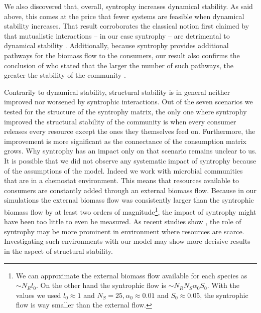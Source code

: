 \documentclass[12pt, titlepage]{report}
\begin{document}
We also discovered that, overall, syntrophy increases dynamical stability. As said above, this comes at the price that fewer systems are feasible when dynamical stability increases. That result corroborates the classical notion first claimed by \citeauthor{may_qualitative_1973} that mutualistic interactions -- in our case syntrophy -- are detrimental to dynamical stability \cite{may_qualitative_1973}. Additionally, because syntrophy provides additional pathways for the biomass flow to the consumers, our result also confirms the conclusion of \citeauthor{macarthur_fluctuations_1955} who stated that the larger the number of such pathways, the greater the stability of the community \cite{macarthur_fluctuations_1955}.

Contrarily to dynamical stability, structural stability is in general neither improved nor worsened by syntrophic interactions. Out of the seven scenarios we tested for the structure of the syntrophy matrix, the only one where syntrophy improved the structural stability of the community is when every consumer releases every resource except the ones they themselves feed on. Furthermore, the improvement is more significant as the connectance of the consumption matrix grows. Why syntrophy has an impact only on that scenario remains unclear to us. It is possible that we did not observe any systematic impact of syntrophy because of the assumptions of the model. Indeed we work with microbial communities that are in a chemostat environment. This means that resources available to consumers are constantly added through an external biomass flow. Because in our simulations the external biomass flow was consistently larger than the syntrophic biomass flow by at least two orders of magnitude\footnote{We can approximate the external biomass flow available for each species as $ \sim N_R l_0$. On the other hand the syntrophic flow is $\sim N_R N_S \alpha_0 S_0$. With the values we used $l_0 \approx 1$ and $N_S=25, \alpha_0 \approx 0.01$ and $S_0 \approx 0.05$, the syntrophic flow is way smaller than the external flow.}, the impact of syntrophy might have been too little to even be measured. As recent studies show \cite{pacheco_costless_2019}, the role of syntrophy may be more prominent in environment where resources are scarce. Investigating such environments with our model may show more decisive results in the aspect of structural stability.
\end{document}
